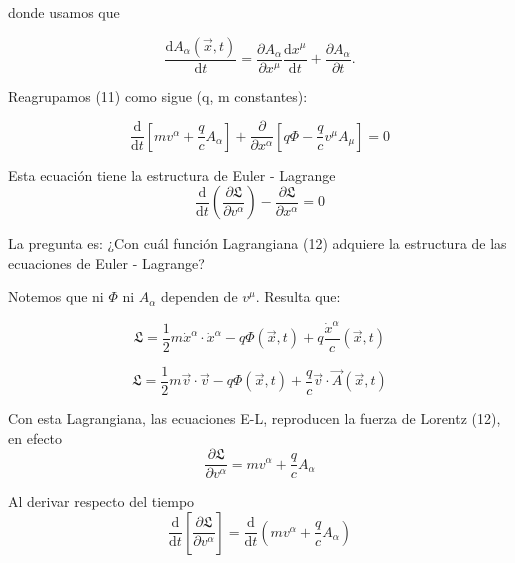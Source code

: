 \documentclass{article}
\begin{document}
donde usamos que

\begin{equation*}
	\frac{\mathrm{d} A_{\alpha}(\vec{x}, t)}{\mathrm{d} t} = \frac{\partial A_{\alpha}}{\partial x^{\mu}}\frac{\mathrm{d} x^{\mu}}{\mathrm{d} t} + \frac{\partial A_{\alpha}}{\partial t}.
\end{equation*}

Reagrupamos (11) como sigue (q, m constantes):

\begin{equation}
	\frac{\mathrm{d} }{\mathrm{d} t}\left [ mv^{\alpha} + \frac{q}{c}A_{\alpha} \right ] + \frac{\partial }{\partial x^{\alpha}}\left [ q\Phi - \frac{q}{c}v^{\mu}A_{\mu} \right ] = 0
\end{equation}

Esta ecuación tiene la estructura de Euler - Lagrange
\begin{equation*}
    \frac{\mathrm{d} }{\mathrm{d} t} \left ( \frac{\partial \mathfrak{L}}{\partial v^{\alpha}} \right ) - \frac{\partial \mathfrak{L}}{\partial x^{\alpha}} = 0
\end{equation*}

La pregunta es: ¿Con cuál función Lagrangiana (12) adquiere la estructura de las ecuaciones de Euler - Lagrange?

Notemos que ni $\Phi$ ni $A_{\alpha}$ dependen de $v^{\mu}$. Resulta que:

\begin{equation*}
    \mathfrak{L} = \frac{1}{2} m \dot x^{\alpha}\cdot\dot x^{\alpha} - q\Phi(\vec{x},t) + q\frac{\dot x^{\alpha}}{c}(\vec{x},t)
\end{equation*} 

\begin{equation}
	\mathfrak{L} = \frac{1}{2}m\vec{v}\cdot\vec{v} - q\Phi(\vec{x},t) + \frac{q}{c}\vec{v}\cdot \vec{A}(\vec{x},t)
\end{equation} 

Con esta Lagrangiana, las ecuaciones E-L, reproducen la fuerza de Lorentz (12), en efecto  
\begin{equation*}
    \frac{\partial \mathfrak{L}}{\partial v^{\alpha}} = mv^{\alpha} + \frac{q}{c}A_{\alpha}
\end{equation*}

Al derivar respecto del tiempo
\begin{equation*}
    \frac{\mathrm{d} }{\mathrm{d} t} \left[ \frac{\partial \mathfrak{L}}{\partial v^{\alpha}} \right] = \frac{\mathrm{d} }{\mathrm{d} t} \left( mv^{\alpha} + \frac{q}{c}A_{\alpha}\right)
\end{equation*}
\end{document}
